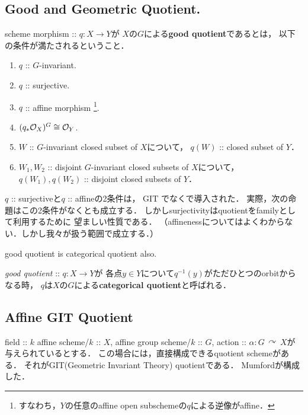 \documentclass[a4paper]{jsarticle}
\newcommand{\acton}{\,\curvearrowright\,}
\begin{document}
    \subsection{Good and Geometric Quotient.}
    \begin{Def}
        scheme morphism :: $q: X \to Y$が
        $X$の$G$による\textbf{good quotient}であるとは，
        以下の条件が満たされるということ．
        \begin{enumerate}[label=(\roman*), leftmargin=*]
        \item $q$ :: $G$-invariant.
        \item $q$ :: surjective.
        \item $q$ :: affine morphism
              \footnote{ すなわち，$Y$の任意のaffine open subschemeの$q$による逆像がaffine． }.
        \item $(q_*\mathcal{O}_X)^G \cong \mathcal{O}_Y$.
        \item
            $W$ :: $G$-invariant closed subset of $X$について，
            $q(W)$ :: closed subset of $Y$．
        \item
            $W_1, W_2$ :: disjoint $G$-invariant closed subsets of $X$について，
            $q(W_1), q(W_2)$ :: disjoint closed subsets of $Y$．
    \end{enumerate}
    \end{Def}
    $q$ :: surjectiveと$q$ :: affineの2条件は，
    GIT \cite{GIT}でなく\cite{Ses}で導入された．
    実際，次の命題はこの2条件がなくとも成立する．
    しかしsurjectivityはquotientをfamilyとして利用するために
    望ましい性質である．
    （affinenessについてはよくわからない．しかし我々が扱う範囲で成立する．）

    \begin{Prop}
        good quotient is categorical quotient also.
    \end{Prop}

    \begin{Def}
        \textit{good quotient} :: $q: X \to Y$が
        各点$y \in Y$について$q^{-1}(y)$がただひとつのorbitからなる時，
        $q$は$X$の$G$による\textbf{categorical quotient}と呼ばれる．
    \end{Def}


    \subsection{Affine GIT Quotient}
    field :: $k$
    affine scheme/$k$ :: $X$,
    affine group scheme/$k$ :: $G$,
    action :: $\alpha: G \acton X$が与えられているとする．
    この場合には，直接構成できるquotient schemeがある．
    それがGIT(Geometric Invariant Theory) quotientである．
    Mumfordが構成した．
    
\end{document}

